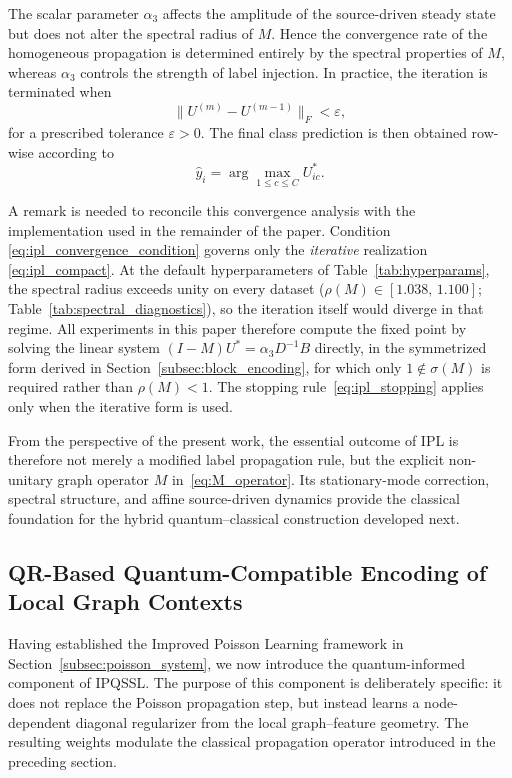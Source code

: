 \documentclass[11pt,a4paper]{article}
\begin{document}
The scalar parameter \(\alpha_3\) affects the amplitude of the source-driven
steady state but does not alter the spectral radius of \(M\). Hence the
convergence rate of the homogeneous propagation is determined entirely by
the spectral properties of \(M\), whereas \(\alpha_3\) controls the strength
of label injection. In practice, the iteration is terminated when
\begin{equation}
\|U^{(m)}-U^{(m-1)}\|_F<\varepsilon,
\label{eq:ipl_stopping}
\end{equation}
for a prescribed tolerance \(\varepsilon>0\). The final class prediction is
then obtained row-wise according to
\begin{equation}
\widehat y_i
=
\arg\max_{1\leq c\leq C}
U^*_{ic}.
\label{eq:ipl_prediction}
\end{equation}

A remark is needed to reconcile this convergence analysis with the
implementation used in the remainder of the paper. Condition
\eqref{eq:ipl_convergence_condition} governs only the \emph{iterative}
realization \eqref{eq:ipl_compact}. At the default hyperparameters of
Table~\ref{tab:hyperparams}, the spectral radius exceeds unity on every
dataset ($\rho(M)\in[1.038,\,1.100]$;
Table~\ref{tab:spectral_diagnostics}), so the iteration itself would
diverge in that regime. All experiments in this paper therefore compute
the fixed point by solving the linear system
$(I-M)U^{*}=\alpha_3D^{-1}B$ directly, in the symmetrized form derived in
Section~\ref{subsec:block_encoding}, for which only
$1\notin\sigma(M)$ is required rather than $\rho(M)<1$. The stopping
rule~\eqref{eq:ipl_stopping} applies only when the iterative form is
used.

From the perspective of the present work, the essential outcome of IPL is
therefore not merely a modified label propagation rule, but the explicit
non-unitary graph operator \(M\) in~\eqref{eq:M_operator}. Its stationary-mode
correction, spectral structure, and affine source-driven dynamics provide the
classical foundation for the hybrid quantum--classical construction developed
next.

\subsection{QR-Based Quantum-Compatible Encoding of Local Graph Contexts}
\label{subsec:qr_encoding}

Having established the Improved Poisson Learning framework in
Section~\ref{subsec:poisson_system}, we now introduce the quantum-informed
component of \textsc{IPQSSL}. The purpose of this component is deliberately
specific: it does not replace the Poisson propagation step, but instead learns
a node-dependent diagonal regularizer from the local graph--feature geometry.
The resulting weights modulate the classical propagation operator introduced
in the preceding section.
\end{document}
